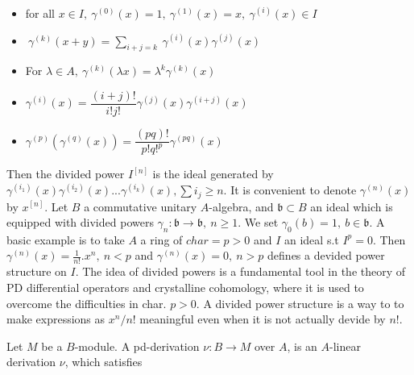 \documentclass[12pt,twoside]{amsart}
\begin{document}
\begin{itemize}
\item for all $x \in I, \ \gamma^{(0)}(x)=1,  \ \gamma^{(1)}(x)=x, \ \gamma^{(i)}(x) \in I $

\vspace{0.4cm}

\item $\ \gamma^{(k)}(x+y)=\sum_{i+j=k}\ \gamma^{(i)}(x) \gamma^{(j)}(x) $

\vspace{0.3cm}

\item For $\lambda \in A, \ \gamma^{(k)}(\lambda x)= \lambda^k \gamma^{(k)}(x) $

\vspace{0.3cm}

\item $ \gamma^{(i)}(x)=\dfrac{(i+j)!}{i!j!} \gamma^{(j)}(x) \gamma^{(i+j)}(x)$

\vspace{0.2cm}

\item $ \gamma^{(p)}(\gamma^{(q)}(x))= \dfrac{(pq)!}{p!q!^p}\gamma^{(pq)}(x)$
\end{itemize}

\vspace{0.5cm}

\noindent
Then the divided power $I^{[n]}$ is the ideal generated by 
$ \gamma^{(i_1)}(x) \gamma^{(i_2)}(x)... \gamma^{(i_k)}(x), \sum i_j \geq n$. It is convenient to denote $\gamma^{(n)}(x)$ by $x^{[n]}$. Let $B$ a commutative unitary $A$-algebra, and $\mathfrak{b} \subset B$ an ideal which is equipped with divided powers $\gamma_n :\mathfrak{b} \to \mathfrak{b}, \ n \geq 1$. We set $\gamma_0(b)=1, \ b \in \mathfrak{b}$. A basic example is to take $A$ a ring of $char =p>0$ and $I$ an ideal s.t $I^p=0$. Then $\gamma^{(n)}(x)=\frac{1}{n!}.x^n, \ n <p$ and $\gamma^{(n)}(x)=0, \ n>p$ defines a devided power structure on $I$. The idea of divided powers is a fundamental tool in the theory of PD differential operators and crystalline cohomology, where it is used to overcome the difficulties in char. $p >0$. A divided power structure is a way to to make expressions as $x^n/n!$ meaningful even when it is not actually devide by $n!$. 

\vspace{0.5cm}

\noindent
Let $M$ be a $B$-module. A pd-derivation $\nu:B \to M$ over $A$, is an $A$-linear derivation $\nu$, which satisfies 
\end{document}
